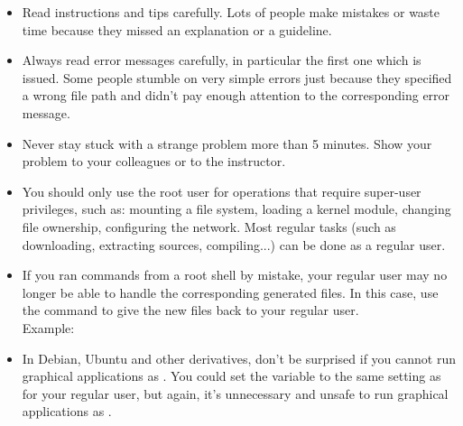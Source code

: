 \begin{itemize}

\item Read instructions and tips carefully. Lots of people make
  mistakes or waste time because they missed an explanation or a
  guideline.

\item Always read error messages carefully, in particular the first
  one which is issued. Some people stumble on very simple errors just
  because they specified a wrong file path and didn't pay enough
  attention to the corresponding error message.

\item Never stay stuck with a strange problem more than 5
  minutes. Show your problem to your colleagues or to the instructor.

\item You should only use the root user for operations that require
  super-user privileges, such as: mounting a file system, loading a
  kernel module, changing file ownership, configuring the
  network. Most regular tasks (such as downloading, extracting
  sources, compiling...) can be done as a regular user.

\item If you ran commands from a root shell by mistake, your regular
  user may no longer be able to handle the corresponding generated
  files. In this case, use the  command to give the new
  files back to your regular user.\\
  Example: 

\item In Debian, Ubuntu and other derivatives, don't be surprised if
  you cannot run graphical applications as . You could set the
   variable to the same setting as for your regular user, but
  again, it's unnecessary and unsafe to run graphical applications as
  .

\end{itemize}

